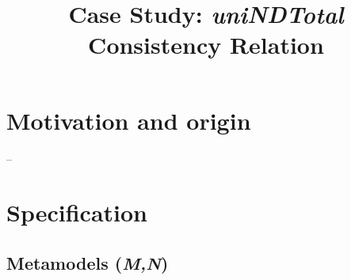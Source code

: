 \documentclass{article}
\begin{document}
\title{Case Study: \textit{uniNDTotal} Consistency Relation}

\maketitle


\section{Motivation and origin}

--

\section{Specification}
\label{sec:spec}

\subsection{Metamodels (\textit{M,N})}
\label{sec:metamodels}
\end{document}
